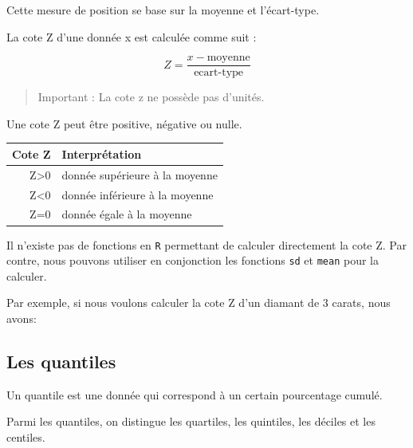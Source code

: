 \documentclass[]{book}
\newenvironment{Shaded}{\begin{snugshade}}{\end{snugshade}}
\newcommand{\DecValTok}[1]{\textcolor[rgb]{0.00,0.00,0.81}{#1}}
\newcommand{\KeywordTok}[1]{\textcolor[rgb]{0.13,0.29,0.53}{\textbf{#1}}}
\newcommand{\NormalTok}[1]{#1}
\newcommand{\OperatorTok}[1]{\textcolor[rgb]{0.81,0.36,0.00}{\textbf{#1}}}
\theoremstyle{definition}
\theoremstyle{definition}
\theoremstyle{definition}
\theoremstyle{remark}
\begin{document}
Cette mesure de position se base sur la moyenne et l'écart-type.

La cote Z d'une donnée x est calculée comme suit :

\begin{equation}
Z = \dfrac{x-\text{moyenne}}{\text{ecart-type}}
\end{equation}

\begin{quote}
Important : La cote z ne possède pas d'unités.
\end{quote}

Une cote Z peut être positive, négative ou nulle.

\begin{longtable}[]{@{}rl@{}}
\toprule
Cote Z & Interprétation\tabularnewline
\midrule
\endhead
Z\textgreater{}0 & donnée supérieure à la moyenne\tabularnewline
Z\textless{}0 & donnée inférieure à la moyenne\tabularnewline
Z=0 & donnée égale à la moyenne\tabularnewline
\bottomrule
\end{longtable}

Il n'existe pas de fonctions en \texttt{R} permettant de calculer
directement la cote Z. Par contre, nous pouvons utiliser en conjonction
les fonctions \texttt{sd} et \texttt{mean} pour la calculer.

Par exemple, si nous voulons calculer la cote Z d'un diamant de 3
carats, nous avons:

\begin{Shaded}
\end{Shaded}

\hypertarget{les-quantiles}{%
\subsection{Les quantiles}\label{les-quantiles}}

Un quantile est une donnée qui correspond à un certain pourcentage
cumulé.

Parmi les quantiles, on distingue les quartiles, les quintiles, les
déciles et les centiles.
\end{document}
